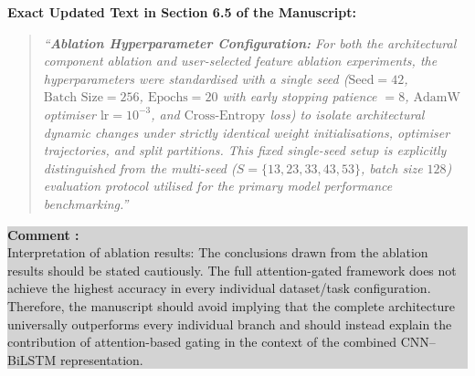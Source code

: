 \documentclass[11pt]{article}
\newcounter{commentcnt}
\newcommand{\question}[1]{
  \stepcounter{commentcnt}
  \vspace{1.5em}
  \noindent
  \colorbox{lightgray}{
    \parbox{\dimexpr\textwidth-2\fboxsep\relax}{
      \color{darkgreen}
      \textbf{Comment \thecommentcnt:} \\
      #1
    }
  }
  \vspace{0.5em}
}
\begin{document}
{\vspace{0.5em}
\noindent\textbf{Exact Updated Text in Section 6.5 of the Manuscript:}
\begin{quote}
\textit{``\textbf{Ablation Hyperparameter Configuration:} For both the architectural component ablation and user-selected feature ablation experiments, the hyperparameters were standardised with a single seed ($\text{Seed} = 42$, $\text{Batch Size} = 256$, $\text{Epochs} = 20$ with early stopping patience $= 8$, $\text{AdamW}$ optimiser $\text{lr} = 10^{-3}$, and $\text{Cross-Entropy}$ loss) to isolate architectural dynamic changes under strictly identical weight initialisations, optimiser trajectories, and split partitions. This fixed single-seed setup is explicitly distinguished from the multi-seed ($S=\{13, 23, 33, 43, 53\}$, batch size $128$) evaluation protocol utilised for the primary model performance benchmarking.''}
\end{quote}
}

\question{Interpretation of ablation results: The conclusions drawn from the ablation results should be stated cautiously. The full attention-gated framework does not achieve the highest accuracy in every individual dataset/task configuration. Therefore, the manuscript should avoid implying that the complete architecture universally outperforms every individual branch and should instead explain the contribution of attention-based gating in the context of the combined CNN–BiLSTM representation.}
\end{document}

